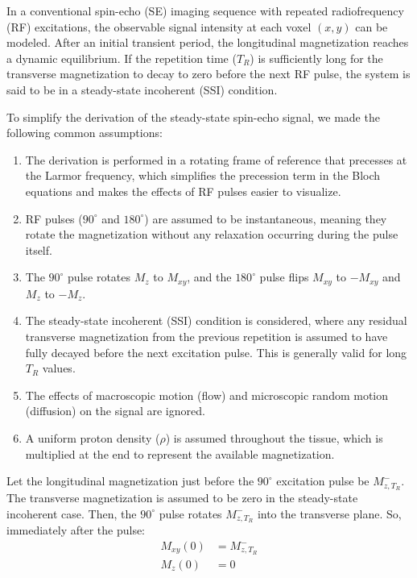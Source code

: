 \documentclass[10pt,a4paper,twoside]{article}
\begin{document}
In a conventional spin-echo (SE) imaging sequence with repeated radiofrequency (RF) excitations, the observable signal intensity at each voxel $(x, y)$ can be modeled. After an initial transient period, the longitudinal magnetization reaches a dynamic equilibrium. If the repetition time ($T_R$) is sufficiently long for the transverse magnetization to decay to zero before the next RF pulse, the system is said to be in a steady-state incoherent (SSI) condition. 

To simplify the derivation of the steady-state spin-echo signal, we made the following common assumptions:
\begin{enumerate}
    \item The derivation is performed in a rotating frame of reference that precesses at the Larmor frequency, which simplifies the precession term in the Bloch equations and makes the effects of RF pulses easier to visualize.
    \item RF pulses ($90^\circ$ and $180^\circ$) are assumed to be instantaneous, meaning they rotate the magnetization without any relaxation occurring during the pulse itself.
    \item The $90^\circ$ pulse rotates $M_z$ to $M_{xy}$, and the $180^\circ$ pulse flips $M_{xy}$ to $-M_{xy}$ and $M_{z}$ to $-M_{z}$.
    \item The steady-state incoherent (SSI) condition is considered, where any residual transverse magnetization from the previous repetition is assumed to have fully decayed before the next excitation pulse. This is generally valid for long $T_R$ values.
    \item The effects of macroscopic motion (flow) and microscopic random motion (diffusion) on the signal are ignored.
    \item A uniform proton density ($\rho$) is assumed throughout the tissue, which is multiplied at the end to represent the available magnetization.
\end{enumerate}

Let the longitudinal magnetization just before the $90^\circ$ excitation pulse be $M_{z,T_R}^-$. The transverse magnetization is assumed to be zero in the steady-state incoherent case. Then, the $90^\circ$ pulse rotates $M_{z,T_R}^-$ into the transverse plane. So, immediately after the pulse:
\begin{align*}
M_{xy}(0) &= M_{z,T_R}^- \\
M_z(0) &= 0
\end{align*}
\end{document}
